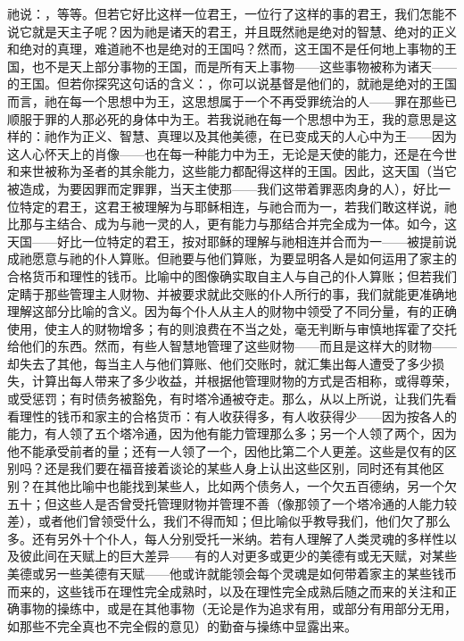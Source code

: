 祂说：，等等。但若它好比这样一位君王，一位行了这样的事的君王，我们怎能不说它就是天主子呢？因为祂是诸天的君王，并且既然祂是绝对的智慧、绝对的正义和绝对的真理，难道祂不也是绝对的王国吗？然而，这王国不是任何地上事物的王国，也不是天上部分事物的王国，而是所有天上事物——这些事物被称为诸天——的王国。但若你探究这句话的含义：，你可以说基督是他们的，就祂是绝对的王国而言，祂在每一个思想中为王，这思想属于一个不再受罪统治的人——罪在那些已顺服于罪的人那必死的身体中为王。若我说祂在每一个思想中为王，我的意思是这样的：祂作为正义、智慧、真理以及其他美德，在已变成天的人心中为王——因为这人心怀天上的肖像——也在每一种能力中为王，无论是天使的能力，还是在今世和来世被称为圣者的其余能力，这些能力都配得这样的王国。因此，这天国（当它被造成，为要因罪而定罪罪，当天主使那——我们这带着罪恶肉身的人），好比一位特定的君王，这君王被理解为与耶稣相连，与祂合而为一，若我们敢这样说，祂比那与主结合、成为与祂一灵的人，更有能力与那结合并完全成为一体。如今，这天国——好比一位特定的君王，按对耶稣的理解与祂相连并合而为一——被提前说成祂愿意与祂的仆人算账。但祂要与他们算账，为要显明各人是如何运用了家主的合格货币和理性的钱币。比喻中的图像确实取自主人与自己的仆人算账；但若我们定睛于那些管理主人财物、并被要求就此交账的仆人所行的事，我们就能更准确地理解这部分比喻的含义。因为每个仆人从主人的财物中领受了不同分量，有的正确使用，使主人的财物增多；有的则浪费在不当之处，毫无判断与审慎地挥霍了交托给他们的东西。然而，有些人智慧地管理了这些财物——而且是这样大的财物——却失去了其他，每当主人与他们算账、他们交账时，就汇集出每人遭受了多少损失，计算出每人带来了多少收益，并根据他管理财物的方式是否相称，或得尊荣，或受惩罚；有时债务被豁免，有时塔冷通被夺走。那么，从以上所说，让我们先看看理性的钱币和家主的合格货币：有人收获得多，有人收获得少——因为按各人的能力，有人领了五个塔冷通，因为他有能力管理那么多；另一个人领了两个，因为他不能承受前者的量；还有一人领了一个，因他比第二个人更差。这些是仅有的区别吗？还是我们要在福音接着谈论的某些人身上认出这些区别，同时还有其他区别？在其他比喻中也能找到某些人，比如两个债务人，一个欠五百德纳，另一个欠五十；但这些人是否曾受托管理财物并管理不善（像那领了一个塔冷通的人能力较差），或者他们曾领受什么，我们不得而知；但比喻似乎教导我们，他们欠了那么多。还有另外十个仆人，每人分别受托一米纳。若有人理解了人类灵魂的多样性以及彼此间在天赋上的巨大差异——有的人对更多或更少的美德有或无天赋，对某些美德或另一些美德有天赋——他或许就能领会每个灵魂是如何带着家主的某些钱币而来的，这些钱币在理性完全成熟时，以及在理性完全成熟后随之而来的关注和正确事物的操练中，或是在其他事物（无论是作为追求有用，或部分有用部分无用，如那些不完全真也不完全假的意见）的勤奋与操练中显露出来。\par

